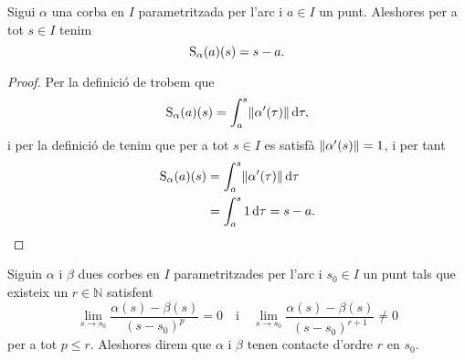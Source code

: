 \documentclass[../../Main.tex]{subfiles}
\begin{document}
	\begin{observation}
		Sigui \(\alpha\) una corba en \(I\) parametritzada per l'arc i \(a\in I\) un punt. Aleshores per a tot \(s\in I\) tenim
		\[
		    \operatorname{S}_{\alpha}(a)(s)=s-a.
		\]
		\begin{proof}
			Per la definició de  trobem que
			\[
			    \funciolongituddarc_{\alpha}(a)(s)=\int_{a}^{s}\norm{\alpha'(\tau)}\diff\tau,
			\]
			i per la definició de  tenim que  per a tot \(s\in I\) es satisfà \(\norm{\alpha'(s)}=1\), i per tant
			\begin{align*}
				\funciolongituddarc_{\alpha}(a)(s)&=\int_{a}^{s}\norm{\alpha'(\tau)}\diff\tau \\
				&=\int_{a}^{s}1\diff\tau=s-a.\qedhere
			\end{align*}
		\end{proof}
	\end{observation}
	\begin{definition}[Contacte]
		\label{def:contacte entre dues corbes parametritzades per l'arc}
		Siguin \(\alpha\) i \(\beta\) dues corbes en \(I\) parametritzades per l'arc i \(s_{0}\in I\) un punt tals que existeix un \(r\in\mathbb{N}\) satisfent
		\[
		    \lim_{s\to s_{0}}\frac{\alpha(s)-\beta(s)}{(s-s_{0})^{p}}=0\quad\text{i}\quad\lim_{s\to s_{0}}\frac{\alpha(s)-\beta(s)}{(s-s_{0})^{r+1}}\neq0
		\]
		per a tot \(p\leq r\). Aleshores direm que \(\alpha\) i \(\beta\) tenen contacte d'ordre \(r\) en \(s_{0}\).
	\end{definition}
\end{document}
